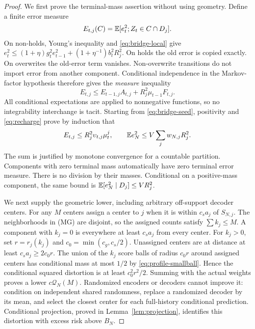 \begin{proof}
We first prove the terminal-mass assertion without using geometry. Define a finite error measure
\[
 E_{t,j}(C)=\mathbb E[e_t^2;Z_t\in C\cap D_j].
\]
On non-holds, Young's inequality and \eqref{eq:bridge-local} give
$e_t^2\le(1+\eta)g_t^2e_{t-1}^2+(1+\eta^{-1})b_t^2R_j^2$.
On holds the old error is copied exactly. On overwrites the old-error term vanishes. Non-overwrite transitions do not import error from another component. Conditional independence in the Markov-factor hypothesis therefore gives the \emph{measure} inequality
\begin{equation}\label{eq:error-measure-step}
 E_{t,j}\le E_{t-1,j}A_{t,j}+R_j^2\mu_{t-1}F_{t,j}.
\end{equation}
All conditional expectations are applied to nonnegative functions, so no integrability interchange is tacit. Starting from \eqref{eq:bridge-seed}, positivity and \eqref{eq:recharge} prove by induction that
\begin{equation}\label{eq:terminal-conditional}
 E_{t,j}\le R_j^2 \upsilon_{t,j}\mu_t^j,\qquad
 \mathbb E e_N^2\le V\sum_jw_{N,j}R_j^2.
\end{equation}
The sum is justified by monotone convergence for a countable partition. Components with zero terminal mass automatically have zero terminal error measure. There is no division by their masses. Conditional on a positive-mass component, the same bound is $\mathbb E[e_N^2\mid D_j]\le V R_j^2$.

We next supply the geometric lower, including arbitrary off-support decoder centers. For any $M$ centers assign a center to $j$ when it is within $c_s a_j$ of $S_{N,j}$. The neighborhoods in \textup{(MG)} are disjoint, so the assigned counts satisfy $\sum k_j\le M$. A component with $k_j=0$ is everywhere at least $c_s a_j$ from every center. For $k_j>0$, set $r=r_j(k_j)$ and $c_0=\min(c_g,c_s/2)$. Unassigned centers are at distance at least $c_s a_j\ge 2c_0r$. The union of the $k_j$ score balls of radius $c_0r$ around assigned centers has conditional mass at most $1/2$ by \eqref{eq:profile-smallball}. Hence the conditional squared distortion is at least $c_0^2r^2/2$. Summing with the actual weights proves a lower $c\mathcal Q_N(M)$. Randomized encoders or decoders cannot improve it: condition on independent shared randomness, replace a randomized decoder by its mean, and select the closest center for each full-history conditional prediction. Conditional projection, proved in Lemma~\ref{lem:projection}, identifies this distortion with excess risk above $B_N$.


\end{proof}
